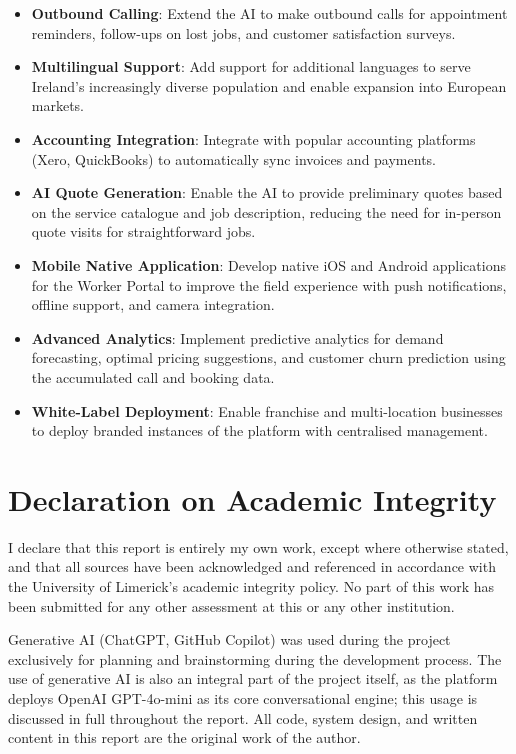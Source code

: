 \documentclass[conference]{IEEEtran}
\begin{document}
\begin{itemize}
\item \textbf{Outbound Calling}: Extend the AI to make outbound calls for appointment reminders, follow-ups on lost jobs, and customer satisfaction surveys.
\item \textbf{Multilingual Support}: Add support for additional languages to serve Ireland's increasingly diverse population and enable expansion into European markets.
\item \textbf{Accounting Integration}: Integrate with popular accounting platforms (Xero, QuickBooks) to automatically sync invoices and payments.
\item \textbf{AI Quote Generation}: Enable the AI to provide preliminary quotes based on the service catalogue and job description, reducing the need for in-person quote visits for straightforward jobs.
\item \textbf{Mobile Native Application}: Develop native iOS and Android applications for the Worker Portal to improve the field experience with push notifications, offline support, and camera integration.
\item \textbf{Advanced Analytics}: Implement predictive analytics for demand forecasting, optimal pricing suggestions, and customer churn prediction using the accumulated call and booking data.
\item \textbf{White-Label Deployment}: Enable franchise and multi-location businesses to deploy branded instances of the platform with centralised management.
\end{itemize}


\section*{Declaration on Academic Integrity}
I declare that this report is entirely my own work, except where otherwise stated, and that all sources have been acknowledged and referenced in accordance with the University of Limerick's academic integrity policy. No part of this work has been submitted for any other assessment at this or any other institution.

Generative AI (ChatGPT, GitHub Copilot) was used during the project exclusively for planning and brainstorming during the development process. The use of generative AI is also an integral part of the project itself, as the platform deploys OpenAI GPT-4o-mini as its core conversational engine; this usage is discussed in full throughout the report. All code, system design, and written content in this report are the original work of the author.
\end{document}
